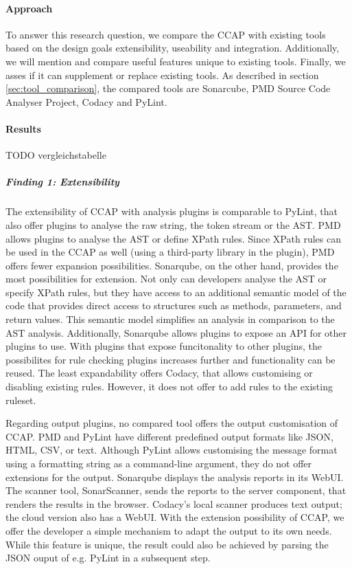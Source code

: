 \paragraph{Approach}
To answer this research question, we compare the CCAP with existing tools based on the design goals extensibility, useability and integration. Additionally, we will mention and compare useful features unique to existing tools. Finally, we asses if it can supplement or replace existing tools. As described in section \ref{sec:tool_comparison}, the compared tools are Sonarcube, PMD Source Code Analyser Project, Codacy and PyLint.

\paragraph{Results}
TODO vergleichstabelle

\subparagraph{Finding 1: Extensibility}
The extensibility of CCAP with analysis plugins is comparable to PyLint, that also offer plugins to analyse the raw string, the token stream or the AST. PMD allows plugins to analyse the AST or define XPath rules. Since XPath rules can be used in the CCAP as well (using a third-party library in the plugin), PMD offers fewer expansion possibilities. Sonarqube, on the other hand, provides the most possibilities for extension. Not only can developers analyse the AST or specify XPath rules, but they have access to an additional semantic model of the code that provides direct access to structures such as methods, parameters, and return values. This semantic model simplifies an analysis in comparison to the AST analysis.
Additionally, Sonarqube allows plugins to expose an API for other plugins to use. With plugins that expose funcitonality to other plugins, the possibilites for rule checking plugins increases further and functionality can be reused. The least expandability offers Codacy, that allows customising or disabling existing rules. However, it does not offer to add rules to the existing ruleset.

Regarding output plugins, no compared tool offers the output customisation of CCAP. PMD and PyLint have different predefined output formats like JSON, HTML, CSV, or text. Although PyLint allows customising the message format using a formatting string as a command-line argument, they do not offer extensions for the output. Sonarqube displays the analysis reports in its WebUI. The scanner tool, SonarScanner, sends the reports to the server component, that renders the results in the browser. Codacy's local scanner produces text output; the cloud version also has a WebUI. 
With the extension possibility of CCAP, we offer the developer a simple mechanism to adapt the output to its own needs. While this feature is unique, the result could also be achieved by parsing the JSON ouput of e.g. PyLint in a subsequent step.

